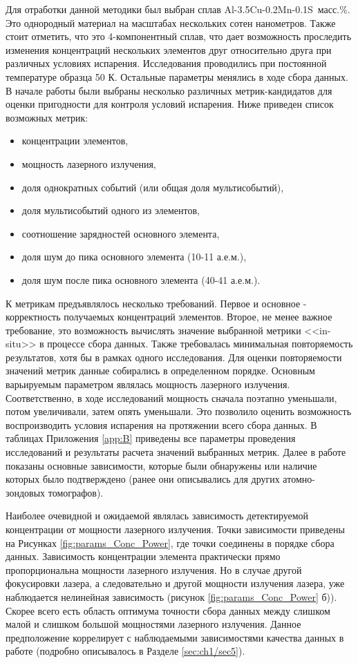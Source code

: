 Для отработки данной методики был выбран сплав Al-3.5Cu-0.2Mn-0.1S~масс.\%. Это однородный материал на масштабах нескольких сотен нанометров. Также стоит отметить, что это 4-компонентный сплав, что дает возможность проследить изменения концентраций нескольких элементов друг относительно друга при различных условиях испарения. Исследования проводились при постоянной температуре образца 50 К. Остальные параметры менялись в ходе сбора данных. В начале работы были выбраны несколько различных метрик-кандидатов для оценки пригодности для контроля условий испарения. Ниже приведен список возможных метрик:

\begin{itemize}
	\item концентрации элементов,
	\item мощность лазерного излучения,
	\item доля однократных событий (или общая доля мультисобытий),
	\item доля мультисобытий одного из элементов,
	\item соотношение зарядностей основного элемента,
	\item доля шум до пика основного элемента (10-11 а.е.м.),
	\item доля шум после пика основного элемента (40-41 а.е.м.).		
\end{itemize}

К метрикам предъявлялось несколько требований. Первое и основное - корректность получаемых концентраций элементов. Второе, не менее важное требование, это возможность вычислять значение выбранной метрики <<in-situ>> в процессе сбора данных. Также требовалась минимальная повторяемость результатов, хотя бы в рамках одного исследования. Для оценки повторяемости значений метрик данные собирались в определенном порядке. Основным варьируемым параметром являлась мощность лазерного излучения. Соответственно, в ходе исследований мощность сначала поэтапно уменьшали, потом увеличивали, затем опять уменьшали. Это позволило оценить возможность воспроизводить условия испарения на протяжении всего сбора данных. В таблицах Приложения \cref{app:B} приведены все параметры проведения исследований и результаты расчета значений выбранных метрик. Далее в работе показаны основные зависимости, которые были обнаружены или наличие которых было подтверждено (ранее они описывались для других атомно-зондовых томографов).

Наиболее очевидной и ожидаемой являлась зависимость детектируемой концентрации от мощности лазерного излучения. Точки зависимости приведены на Рисунках  \cref{fig:params_Conc_Power}, где точки соединены в порядке сбора данных.  Зависимость концентрации элемента практически прямо пропорциональна мощности лазерного излучения. Но в случае другой фокусировки лазера, а следовательно и другой мощности излучения лазера, уже наблюдается нелинейная зависимость (рисунок \cref{fig:params_Conc_Power} б)). Скорее всего есть область оптимума точности сбора данных между слишком малой и слишком большой мощностями лазерного излучения. Данное предположение коррелирует с наблюдаемыми зависимостями качества данных в работе \cite{scbibOptParamsYAFI} (подробно описывалось в Разделе \cref{sec:ch1/sec5}).

